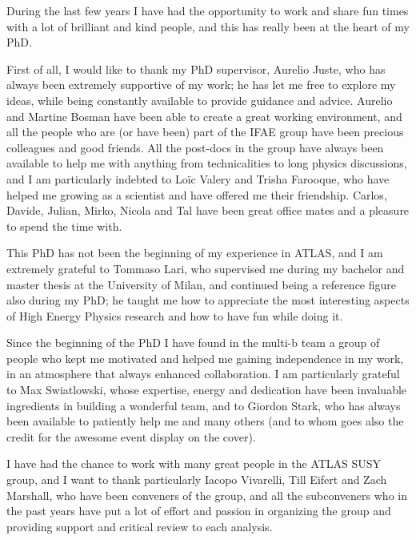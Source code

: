 \par\bigskip  
\par\bigskip

During the last few years I have had the opportunity to work and share fun times with a lot 
of brilliant and kind people, and this has really been at the heart of my PhD. 

\par\medskip 

First of all, I would like to thank my PhD supervisor, Aurelio Juste, who has always been 
extremely supportive of my work; 
he has let me free to explore my ideas, while being constantly available to provide guidance and advice. 
Aurelio and Martine Bosman have been able to create a great working environment, and 
all the people who are (or have been) part of the IFAE group have been precious colleagues and 
good friends.  
All the post-docs in the group have always been available to help me with 
anything from technicalities to long physics discussions, 
and I am particularly indebted to Lo\"ic Valery and Trisha Farooque, who have helped me growing as a scientist and have offered me 
their friendship. 
Carlos, Davide, Julian, Mirko, Nicola and Tal have been great office mates 
and a pleasure to spend the time with. 
 
\par\medskip 

This PhD has not been the beginning of my experience in ATLAS, and I am extremely grateful to 
Tommaso Lari, who supervised me during my bachelor and master thesis at the University of Milan, 
and continued being a reference figure also during my PhD; 
he taught me how to appreciate the most interesting aspects of High Energy Physics research 
and how to have fun while doing it.   

\par\medskip 

Since the beginning of the PhD I have found in the multi-b team a 
group of people who kept me motivated and helped me 
gaining independence in my work, 
in an atmosphere that always enhanced collaboration. %
I am particularly grateful to Max Swiatlowski, whose expertise, energy and dedication have been 
invaluable ingredients in building a wonderful team, 
and to Giordon Stark, who has always been available to patiently help me and many others (and 
to whom goes also the credit for the awesome event display on the cover). 

\par\medskip
I have had the chance to work with many great people in the ATLAS SUSY group, and 
I want to thank particularly Iacopo Vivarelli, Till Eifert and Zach Marshall, who have been conveners of the group,
and all the subconveners who in the past years 
have put a lot of effort and passion in organizing the group and providing support and critical review 
to each analysis. 

